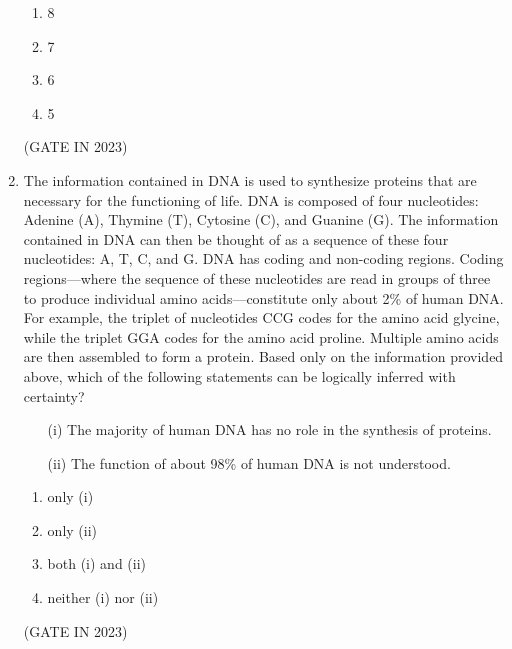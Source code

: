 \documentclass[journal]{IEEEtran}
\begin{document}
\begin{enumerate}
    \begin{enumerate}
        \item 8
        \item 7
        \item 6
        \item 5
    \end{enumerate}
    \hfill(GATE IN 2023)

    \item The information contained in DNA is used to synthesize proteins that are necessary for the functioning of life. DNA is composed of four nucleotides: Adenine (A), Thymine (T), Cytosine (C), and Guanine (G). The information contained in DNA can then be thought of as a sequence of these four nucleotides: A, T, C, and G. DNA has coding and non-coding regions. Coding regions—where the sequence of these nucleotides are read in groups of three to produce individual amino acids—constitute only about 2\% of human DNA. For example, the triplet of nucleotides CCG codes for the amino acid glycine, while the triplet GGA codes for the amino acid proline. Multiple amino acids are then assembled to form a protein. Based only on the information provided above, which of the following statements can be logically inferred with certainty?
    \begin{enumerate}
        \item[(i)] The majority of human DNA has no role in the synthesis of proteins.
        \item[(ii)] The function of about 98\% of human DNA is not understood.
    \end{enumerate}
    
    \begin{enumerate}
        \item only (i)
        \item only (ii)
        \item both (i) and (ii)
        \item neither (i) nor (ii)
    \end{enumerate}
    \hfill(GATE IN 2023)


\end{enumerate}
\end{document}
